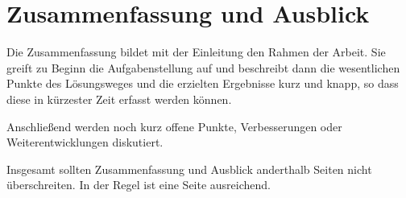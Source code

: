 \chapter{Zusammenfassung und Ausblick}\label{kap:zusammenfassungausblick}
%
Die Zusammenfassung bildet mit der Einleitung den Rahmen der Arbeit. Sie greift zu Beginn die Aufgabenstellung auf und beschreibt dann die wesentlichen Punkte des Lösungsweges und die erzielten Ergebnisse kurz und knapp, so dass diese in kürzester Zeit erfasst werden können.

Anschließend werden noch kurz offene Punkte, Verbesserungen oder Weiterentwicklungen diskutiert.

Insgesamt sollten Zusammenfassung und Ausblick anderthalb Seiten nicht überschreiten. In der Regel ist eine Seite ausreichend.